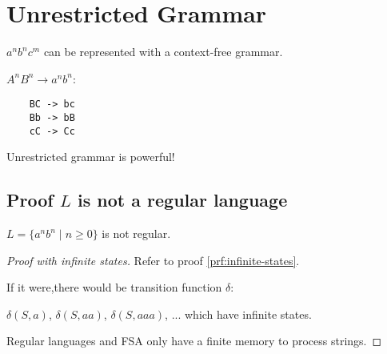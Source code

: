 \section{Unrestricted Grammar}

\(a^nb^nc^m\) can be represented with a context-free grammar.

\(A^nB^n \rightarrow a^nb^n\):

\begin{verbatim}
    BC -> bc
    Bb -> bB
    cC -> Cc
\end{verbatim}

Unrestricted grammar is powerful!

\subsection{Proof \texorpdfstring{$L$}{L} is not a regular language}
\(L = \{a^nb^n \mid n \ge 0\}\) is not regular.

\begin{proof}[Proof with infinite states]
Refer to proof \ref{prf:infinite-states}.

If it were,there would be transition function \(\delta\):

\(\delta(S,a)\), \(\delta(S, aa)\), \(\delta(S, aaa)\), ... which have
infinite states.

Regular languages and FSA only have a finite memory to process
strings.
\end{proof}

